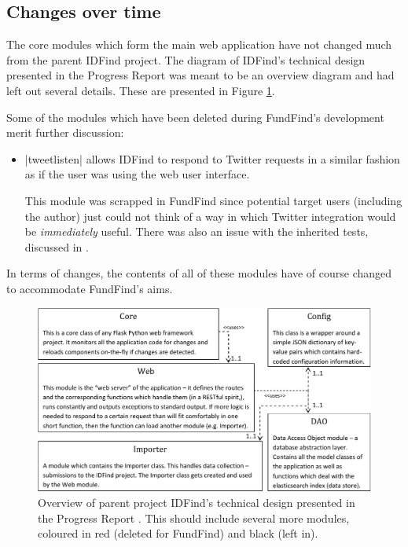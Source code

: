 \subsection{Changes over time}
\label{design-changes}
The core modules which form the main web application have not changed much from the parent IDFind project. The diagram of IDFind's technical design presented in the Progress Report \cite{progress-report} was meant to be an overview diagram and had left out several details. These are presented in Figure \ref{fig:idfind-new-uml}.

Some of the modules which have been deleted during FundFind's development merit further discussion:
\begin{itemize}
	\item |tweetlisten| allows IDFind to respond to Twitter requests in a similar fashion as if the user was using the web user interface.
	
	This module was scrapped in FundFind since potential target users (including the author) just could not think of a way in which Twitter integration would be \emph{immediately} useful. There was also an issue with the inherited tests, discussed in .
\end{itemize}

In terms of changes, the contents of all of these modules have of course changed to accommodate FundFind's aims.

\begin{figure}[H]
\centering
\includegraphics[width=1.00\textwidth,]{Chapter3/idfind-uml.pdf}
\caption{Overview of parent project IDFind's technical design presented in the Progress Report \cite{progress-report}. This should include several more modules, coloured in red (deleted for FundFind) and black (left in).}
\label{fig:idfind-new-uml}
\end{figure}

